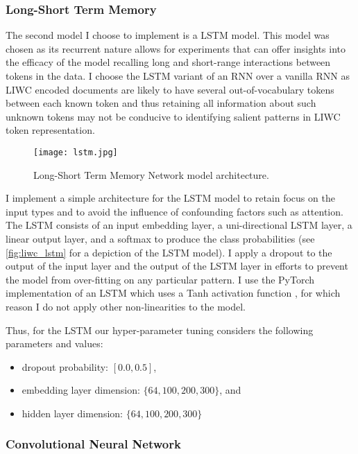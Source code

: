 \subsubsection{Long-Short Term Memory}

The second model I choose to implement is a LSTM model. This model was chosen as its recurrent nature allows for experiments that can offer insights into the efficacy of the model recalling long and short-range interactions between tokens in the data. I choose the LSTM variant of an RNN over a vanilla RNN as LIWC encoded documents are likely to have several out-of-vocabulary tokens between each known token and thus retaining all information about such unknown tokens may not be conducive to identifying salient patterns in LIWC token representation.

\begin{figure}
  \centering
  \texttt{[image: lstm.jpg]}
  \caption{Long-Short Term Memory Network model architecture.}
  \label{fig:liwc_lstm}
\end{figure}

I implement a simple architecture for the LSTM model to retain focus on the input types and to avoid the influence of confounding factors such as attention. The LSTM consists of an input embedding layer, a uni-directional LSTM layer, a linear output layer, and a softmax to produce the class probabilities (see \autoref{fig:liwc_lstm} for a depiction of the LSTM model).
I apply a dropout to the output of the input layer and the output of the LSTM layer in efforts to prevent the model from over-fitting on any particular pattern. I use the PyTorch implementation of an LSTM which uses a Tanh activation function \citep{Paszke:2019}, for which reason I do not apply other non-linearities to the model.

Thus, for the LSTM our hyper-parameter tuning considers the following parameters and values:

\begin{itemize}
  \item dropout probability: $[0.0, 0.5]$,
  \item embedding layer dimension: $\{64, 100, 200, 300\}$, and
  \item hidden layer dimension: $\{64, 100, 200, 300\}$
\end{itemize}

\subsubsection{Convolutional Neural Network}

